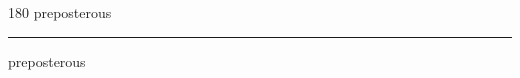 
\begin{frame}
\begin{center}
\begin{turn}{180}
{\fontsize{2.5cm}{1em}\selectfont preposterous}
\end{turn}
\vspace{1em}\par  
\hrule
\vspace{1em}\par  
{\fontsize{2.5cm}{1em}\selectfont preposterous}
\end{center}
\end{frame}
